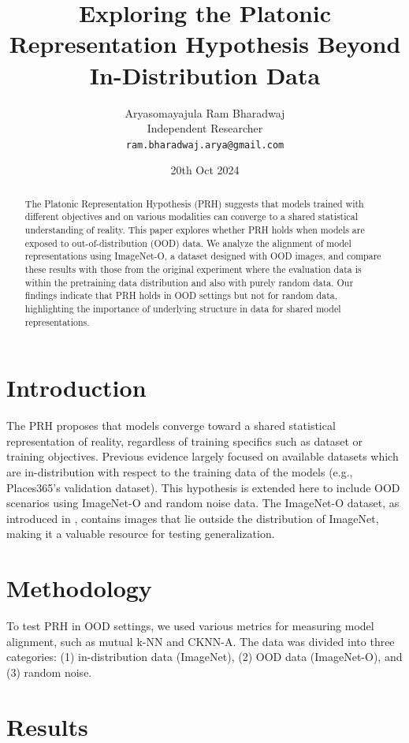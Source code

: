 \documentclass[10pt,a4paper]{article}
\title{Exploring the Platonic Representation Hypothesis Beyond In-Distribution Data}
\author{Aryasomayajula Ram Bharadwaj\\
Independent Researcher\\
\texttt{ram.bharadwaj.arya@gmail.com}}
\date{20th Oct 2024}
\begin{document}
\maketitle

\begin{abstract}
The Platonic Representation Hypothesis (PRH) \cite{huh2024prh} suggests that models trained with different objectives and on various modalities can converge to a shared statistical understanding of reality. This paper explores whether PRH holds when models are exposed to out-of-distribution (OOD) data. We analyze the alignment of model representations using ImageNet-O, a dataset designed with OOD images, and compare these results with those from the original experiment where the evaluation data is within the pretraining data distribution and also with purely random data. Our findings indicate that PRH holds in OOD settings but not for random data, highlighting the importance of underlying structure in data for shared model representations.
\end{abstract}

\section{Introduction}
The PRH proposes that models converge toward a shared statistical representation of reality, regardless of training specifics such as dataset or training objectives. Previous evidence largely focused on available datasets which are in-distribution with respect to the training data of the models (e.g., Places365’s validation dataset). This hypothesis is extended here to include OOD scenarios using ImageNet-O and random noise data. The ImageNet-O dataset, as introduced in \cite{hendrycks2021nae}, contains images that lie outside the distribution of ImageNet, making it a valuable resource for testing generalization.

\section{Methodology}
To test PRH in OOD settings, we used various metrics for measuring model alignment, such as mutual k-NN and CKNN-A. The data was divided into three categories: (1) in-distribution data (ImageNet), (2) OOD data (ImageNet-O), and (3) random noise.

\section{Results}
\end{document}
